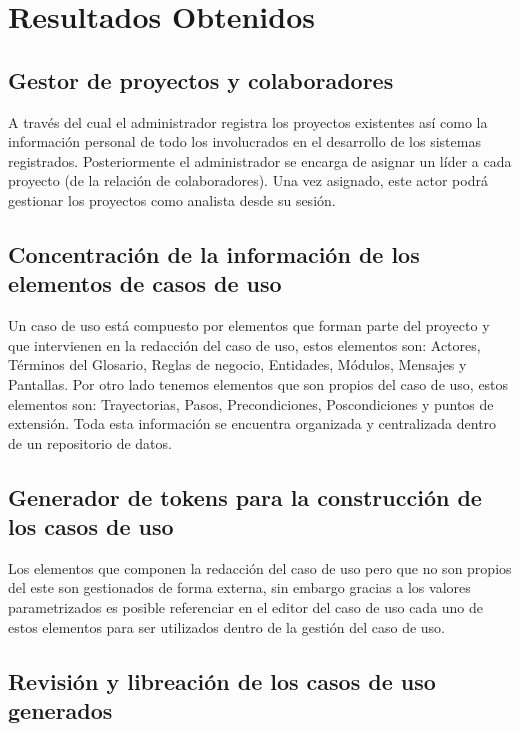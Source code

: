 \chapter{Resultados Obtenidos} \label{cap:nueve}

\section{Gestor de proyectos y colaboradores}

A través del cual el administrador registra los proyectos existentes así como la información personal de todo los involucrados en el desarrollo de los sistemas registrados. Posteriormente el administrador se encarga de asignar un líder a cada proyecto (de la relación de colaboradores). Una vez asignado, este actor podrá gestionar los proyectos como analista desde su sesión.

\section{Concentración de la información de los elementos de casos de uso}

Un caso de uso está compuesto por elementos que forman parte del proyecto y que intervienen en la redacción del caso de uso, estos elementos son: Actores, Términos del Glosario, Reglas de negocio, Entidades, Módulos, Mensajes y Pantallas. Por otro lado tenemos elementos que son propios del caso de uso, estos elementos son: Trayectorias, Pasos, Precondiciones, Poscondiciones y puntos de extensión.
Toda esta información se encuentra organizada y centralizada dentro de un repositorio de datos.

\section{Generador de tokens para la construcción de los casos de uso}

Los elementos que componen la redacción del caso de uso pero que no son propios del este son gestionados de forma externa, sin embargo gracias a los valores parametrizados es posible referenciar en el editor del caso de uso cada uno de estos elementos para ser utilizados dentro de la gestión del caso de uso.

\section{Revisión y libreación de los casos de uso generados}

